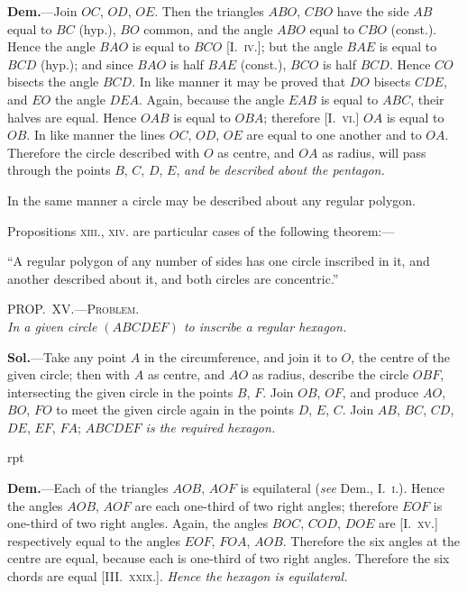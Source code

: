 \documentclass[oneside]{book}
\newcounter{wrapwidth}
\newcommand\myprop[2]{
\bigskip\Needspace*{4\baselineskip}\begin{center}\textsc{#1}\\\medskip\emph{#2}\par\end{center}
}
\newcommand\imgflow[3]{
\setcounter{wrapwidth}{#1}

\begin{wrapfigure}[#2]{r}{\value{wrapwidth}pt}
\begin{center}
\vspace{-0.3in}

\end{center}
\end{wrapfigure}
}
\begin{document}
\textbf{Dem.}---Join $OC$, $OD$, $OE$. Then the triangles\label{traingles} $ABO$,
$CBO$ have the side $AB$ equal to
$BC$ (hyp.), $BO$ common, and the
angle $ABO$ equal to $CBO$ (const.).
Hence the angle $BAO$ is equal to
$BCO$ [\textsc{I.~iv.}]; but the angle $BAE$
is equal to $BCD$ (hyp.); and since
$BAO$ is half $BAE$ (const.), $BCO$
is half $BCD$. Hence $CO$ bisects
the angle $BCD$. In like manner
it may be proved that $DO$ bisects
$CDE$, and $EO$ the angle $DEA$. Again, because the
angle $EAB$ is equal to $ABC$, their halves are equal.
Hence $OAB$ is equal to $OBA$; therefore [\textsc{I.~vi.}] $OA$ is
equal to $OB$. In like manner the lines $OC$, $OD$, $OE$
are equal to one another and to $OA$. Therefore the
circle described with $O$ as centre, and $OA$ as radius,
will pass through the points $B$, $C$, $D$, $E$, \emph{and be described
about the pentagon.}

In the same manner a circle may be described about
any regular polygon.\par\smallskip



\begin{footnotesize}
Propositions \textsc{xiii.}, \textsc{xiv.} are particular cases of the following
theorem:---

``A regular polygon of any number of sides has one circle inscribed
in it, and another described about it, and both circles are
concentric.''
\end{footnotesize}

\myprop{PROP\@.~XV\@.---Problem.}{In a given circle $(ABCDEF)$ to inscribe a regular hexagon.}

\textbf{Sol.}---Take any point $A$ in the circumference, and
join it to $O$, the centre
of the given circle; then
with $A$ as centre, and $AO$
as radius, describe the
circle $OBF$, intersecting
the given circle in the
points $B$, $F$. Join $OB$,
$OF$, and produce $AO$, $BO$,
$FO$ to meet the given
circle again in the points $D$, $E$, $C$. Join $AB$, $BC$, $CD$,
$DE$, $EF$, $FA$; \emph{$ABCDEF$ is the required hexagon.}


\imgflow{156}{8}{f167}

\textbf{Dem.}---Each of the triangles $AOB$, $AOF$ is equilateral
(\emph{see} Dem., \textsc{I.~i.}). Hence the angles $AOB$, $AOF$
are each one-third of two right angles; therefore $EOF$
is one-third of two right angles. Again, the angles
$BOC$, $COD$, $DOE$ are [\textsc{I.~xv.}] respectively equal to the
angles $EOF$, $FOA$, $AOB$. Therefore the six angles at
the centre are equal, because each is one-third of two
right angles. Therefore the six chords are equal [\textsc{III\@.~xxix.}].
\emph{Hence the hexagon is equilateral.}
\end{document}

